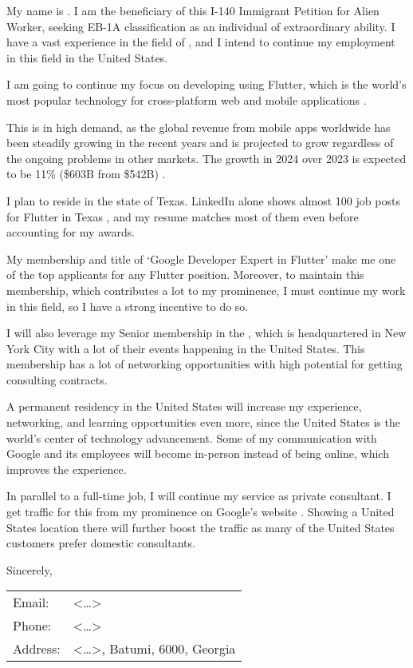 \label{WorkPlan}

My name is \fl.
I am the beneficiary of this I-140 Immigrant Petition for Alien Worker,
seeking EB-1A classification as an individual of extraordinary ability.
I have a vast experience in the field of \fie,
and I intend to continue my employment in this field in the United States.

I am going to continue my focus on developing using Flutter,
which is the world's most popular technology for cross-platform
web and mobile applications .

This is in high demand, as the global revenue from mobile apps worldwide
has been steadily growing in the recent years and is projected to grow
regardless of the ongoing problems in other markets.
The growth in 2024 over 2023 is expected to be 11\% (\$603B from \$542B) .

I plan to reside in the state of Texas.
LinkedIn alone shows almost 100 job posts for Flutter in Texas ,
and my resume matches most of them even before accounting for my awards.

My membership and title of `Google Developer Expert in Flutter'
make me one of the top applicants for any Flutter position.
Moreover, to maintain this membership, which contributes a lot to my prominence,
I must continue my work in this field, so I have a strong incentive to do so.

I will also leverage my Senior membership in the \Ieee,
which is headquartered in New York City with a lot of their events happening in the United States.
This membership has a lot of networking opportunities
with high potential for getting consulting contracts.

A permanent residency in the United States will increase my experience, networking,
and learning opportunities even more, since the United States is the world's center
of technology advancement.
Some of my communication with Google and its employees will become in-person instead of being online,
which improves the experience.

In parallel to a full-time job, I will continue my service as private consultant.
I get traffic for this from my prominence on Google's website .
Showing a United States location there will further boost the traffic
as many of the United States customers prefer domestic consultants.

Sincerely,

\fl

\begin{tabular}{ll}
    Email: & <\dots>\\
    Phone: & <\dots>\\
    Address: & <\dots>, Batumi, 6000, Georgia\\
\end{tabular}

\pagebreak
